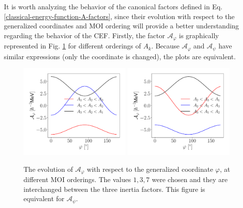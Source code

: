 It is worth analyzing the behavior of the canonical factors defined in Eq. \ref{classical-energy-function-A-factors}, since their evolution with respect to the generalized coordinates and MOI ordering will provide a better understanding regarding the behavior of the CEF. Firstly, the factor $\mathcal{A}_\varphi$ is graphically represented in Fig. \ref{fig-A-varphi-canonical} for different orderings of $A_k$. Because $\mathcal{A}_\varphi$ and $\mathcal{A}_\psi$ have similar expressions (only the coordinate is changed), the plots are equivalent.
\begin{figure}
    \centering
    \includegraphics[width=0.49\textwidth]{Chapters/Figures/A_varphi_1.pdf}
    \includegraphics[width=0.49\textwidth]{Chapters/Figures/A_varphi_2.pdf}
    \caption{The evolution of $\mathcal{A}_\varphi$ with respect to the generalized coordinate $\varphi$, at different MOI orderings. The values $1,3,7$ were chosen and they are interchanged between the three inertia factors. This figure is equivalent for $\mathcal{A}_\psi$.}
    \label{fig-A-varphi-canonical}
\end{figure}

